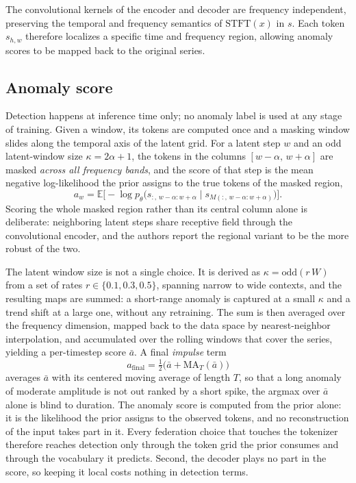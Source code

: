 \documentclass[conference]{IEEEtran}
\begin{document}
The convolutional kernels of the encoder and decoder are frequency independent, preserving the temporal and frequency semantics of $\mathrm{STFT}(x)$ in $s$. Each token $s_{h,w}$ therefore localizes a specific time and frequency region, allowing anomaly scores to be mapped back to the original series.

\subsection{Anomaly score}

Detection happens at inference time only; no anomaly label is used at any stage of training. Given
a window, its tokens are computed once and a masking window slides along the temporal axis of the
latent grid. For a latent step $w$ and an odd latent-window size $\kappa = 2\alpha + 1$, the tokens
in the columns $[w-\alpha,\, w+\alpha]$ are masked \emph{across all frequency bands}, and the score
of that step is the mean negative log-likelihood the prior assigns to the true tokens of the masked
region,
\begin{equation}
  a_w = \mathbb{E}\bigl[-\log p_\theta\bigl(s_{:,\,w-\alpha:w+\alpha} \mid s_{M(:,\,w-\alpha:w+\alpha)}\bigr)\bigr].
  \label{eq:aw}
\end{equation}
Scoring the whole masked region rather than its central column alone is deliberate: neighboring
latent steps share receptive field through the convolutional encoder, and the authors report the
regional variant to be the more robust of the two.

The latent window size is not a single choice. It is derived as $\kappa = \mathrm{odd}(r\,W)$ from a
set of rates $r \in \{0.1, 0.3, 0.5\}$, spanning narrow to wide contexts, and the resulting maps are
summed: a short-range anomaly is captured at a small $\kappa$ and a trend shift at a large one,
without any retraining. The sum is then averaged over the frequency dimension, mapped back to the
data space by nearest-neighbor interpolation, and accumulated over the rolling windows that cover
the series, yielding a per-timestep score $\bar{a}$. A final \emph{impulse} term
\begin{equation}
  a_{\text{final}} = \tfrac{1}{2}\bigl(\bar{a} + \mathrm{MA}_T(\bar{a})\bigr)
  \label{eq:afinal}
\end{equation}
averages $\bar{a}$ with its centered moving average of length $T$, so that a long anomaly of
moderate amplitude is not out ranked by a short spike, the argmax over $\bar{a}$ alone is blind to
duration. The anomaly score is computed from the prior alone: it is the likelihood the prior assigns to the
observed tokens, and no reconstruction of the input takes part in it. Every federation choice that
touches the tokenizer therefore reaches detection only through the token grid the prior consumes
and through the vocabulary it predicts. Second, the decoder plays no part in the score, so keeping
it local costs nothing in detection terms.
\end{document}
